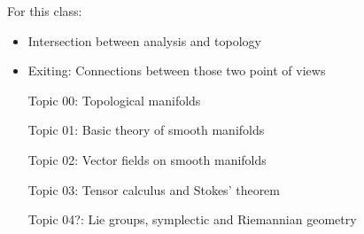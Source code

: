 For this class: 
\begin{itemize}
    \item Intersection between analysis and topology
    \item Exiting: Connections between those two point of views 
\end{itemize}
\begin{enumerate}
    \item[Topic 00:] Topological manifolds 
    \item[Topic 01:] Basic theory of smooth manifolds
    \item[Topic 02:] Vector fields on smooth manifolds
    \item[Topic 03:] Tensor calculus and Stokes' theorem 
    \item[Topic 04?:] Lie groups, symplectic and Riemannian geometry     
\end{enumerate}

